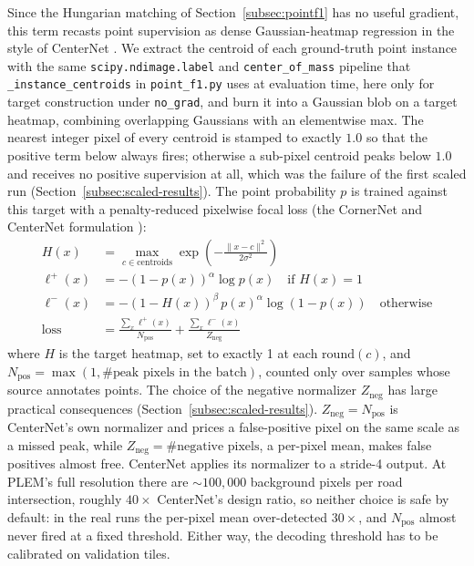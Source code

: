 Since the Hungarian matching of Section~\ref{subsec:pointf1} has no useful gradient, this term
recasts point supervision as dense Gaussian-heatmap regression in the style of CenterNet
\cite{zhou2019centernet}. We extract the centroid of each ground-truth
point instance with the same \texttt{scipy.ndimage.label} and \texttt{center\_of\_mass} pipeline
that \texttt{\_instance\_centroids} in \texttt{point\_f1.py} uses at evaluation time, here only for
target construction under \texttt{no\_grad}, and burn it into a Gaussian blob on a target heatmap,
combining overlapping Gaussians with an elementwise max. The nearest integer pixel of every
centroid is stamped to exactly $1.0$ so that the positive term below always fires; otherwise a
sub-pixel centroid peaks below $1.0$ and receives no positive supervision at all, which was the
failure of the first scaled run (Section~\ref{subsec:scaled-results}). The point probability $p$
is trained against this target with a penalty-reduced pixelwise focal loss (the CornerNet and
CenterNet formulation \cite{law2018cornernet,zhou2019centernet}):
\begin{align}
  H(x) &= \max_{c \in \mathrm{centroids}} \exp\left(-\frac{\|x-c\|^2}{2\sigma^2}\right) \\
  \ell^{+}(x) &= -(1-p(x))^\alpha \log p(x) \quad \text{if } H(x) = 1 \\
  \ell^{-}(x) &= -(1-H(x))^\beta\, p(x)^\alpha \log(1-p(x)) \quad \text{otherwise} \\
  \mathrm{loss} &= \frac{\sum_x \ell^{+}(x)}{N_{\mathrm{pos}}}
                 + \frac{\sum_x \ell^{-}(x)}{Z_{\mathrm{neg}}}
\end{align}
where $H$ is the target heatmap, set to exactly 1 at each $\mathrm{round}(c)$, and
$N_{\mathrm{pos}} = \max(1, \#\text{peak pixels in the batch})$, counted only over samples
whose source annotates points. The choice of the negative normalizer $Z_{\mathrm{neg}}$ has large
practical consequences (Section~\ref{subsec:scaled-results}). $Z_{\mathrm{neg}} = N_{\mathrm{pos}}$
is CenterNet's own normalizer and prices a false-positive pixel on the same scale as a missed
peak, while $Z_{\mathrm{neg}} = \#\text{negative pixels}$, a per-pixel mean, makes false positives
almost free. CenterNet applies its normalizer to a stride-4 output. At PLEM's full resolution
there are ${\sim}100{,}000$ background pixels per road intersection, roughly $40\times$ CenterNet's
design ratio, so neither choice is safe by default: in the real runs the per-pixel mean
over-detected $30\times$, and $N_{\mathrm{pos}}$ almost never fired at a fixed threshold. Either
way, the decoding threshold has to be calibrated on validation tiles.

